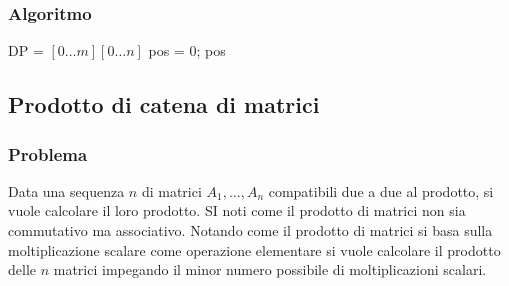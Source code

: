 \subsubsection{Algoritmo}
\begin{algorithm}[H]
\DontPrintSemicolon
{}





\SetKwFunction{}{}
\SetKwFunction{}{}
\SetKwFunction{}{}
\SetKwFunction{}{}
\SetKwFunction{}{}

\caption{\protect\Int \protect{}}
\Int[][] DP = \New \Int$[0\dots m][0\dots n]$\;
\Int pos = 0;
\Return pos\;
\end{algorithm}
\subsection{Prodotto di catena di matrici}
\subsubsection{Problema}
Data una sequenza $n$ di matrici $A_1, \dots, A_n$ compatibili due a due al prodotto, si vuole calcolare il loro prodotto. SI noti come il prodotto di 
matrici non sia commutativo ma associativo. Notando come il prodotto di matrici si basa sulla moltiplicazione scalare come operazione elementare si vuole
calcolare il prodotto delle $n$ matrici impegando il minor numero possibile di moltiplicazioni scalari. 
